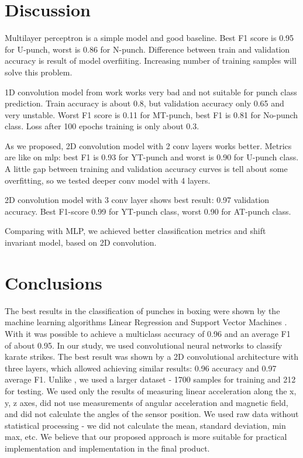 \documentclass[sport,article,submit,moreauthors,pdftex]{Definitions/mdpi}
\begin{document}

\section{Discussion}
Multilayer perceptron is a simple model and good baseline. Best F1 score is 0.95 for U-punch, worst is 0.86 for N-punch. Difference between train and validation accuracy is result of model overfiiting.  Increasing number of training samples will solve this problem.

1D convolution model from \cite{ref-journal9} work works very bad and not suitable for punch class prediction. Train accuracy is about 0.8, but validation accuracy only 0.65 and very unstable. Worst F1 score is 0.11 for MT-punch, best F1 is 0.81 for No-punch class. Loss after 100 epochs training is only about 0.3.

As we proposed, 2D convolution model with 2 conv layers works better. Metrics are like on mlp: best F1 is 0.93 for YT-punch and worst is 0.90 for U-punch class. A little gap between training and validation accuracy curves is tell about some overfitting, so we tested deeper conv model with 4 layers.

2D convolution model with 3 conv layer shows best result: 0.97 validation accuracy. Best F1-score 0.99 for YT-punch class, worst 0.90 for AT-punch class.

Comparing with MLP, we achieved better classification metrics and shift invariant model, based on 2D convolution.

\section{Conclusions}

The best results in the classification of punches in boxing were shown by the machine learning algorithms Linear Regression and Support Vector Machines \cite{ref-journal2}. With it was possible to achieve a multiclass accuracy of 0.96 and an average F1 of about 0.95. In our study, we used convolutional neural networks to classify karate strikes. The best result was shown by a 2D convolutional architecture with three layers, which allowed achieving similar results: 0.96 accuracy and 0.97 average F1.
Unlike \cite{ref-journal2}, we used a larger dataset - 1700 samples for training and 212 for testing. We used only the results of measuring linear acceleration along the x, y, z axes, did not use measurements of angular acceleration and magnetic field, and did not calculate the angles of the sensor position. We used raw data without statistical processing - we did not calculate the mean, standard deviation, min max, etc.
We believe that our proposed approach is more suitable for practical implementation and implementation in the final product.
\end{document}
